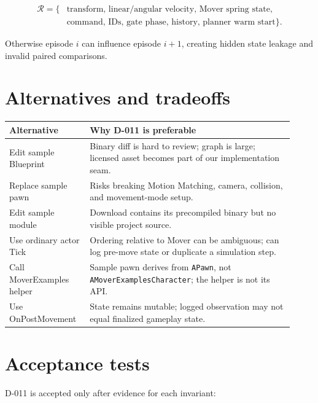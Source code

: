 \documentclass[11pt]{article}
\begin{document}
\begin{align}
  \mathcal{R}=\{&\text{transform, linear/angular velocity, Mover spring state,}\nonumber\\
                 &\text{command, IDs, gate phase, history, planner warm start}\}.
\end{align}

Otherwise episode $i$ can influence episode $i+1$, creating hidden state leakage and invalid paired
comparisons.

\section{Alternatives and tradeoffs}\label{sec:alternatives}

\begin{tabular}{p{0.25\linewidth}p{0.67\linewidth}}
\toprule
Alternative & Why D-011 is preferable \\
\midrule
Edit sample Blueprint & Binary diff is hard to review; graph is large; licensed asset becomes part
of our implementation seam. \\
Replace sample pawn & Risks breaking Motion Matching, camera, collision, and movement-mode setup. \\
Edit sample module & Download contains its precompiled binary but no visible project source. \\
Use ordinary actor Tick & Ordering relative to Mover can be ambiguous; can log pre-move state or
duplicate a simulation step. \\
Call MoverExamples helper & Sample pawn derives from \texttt{APawn}, not
\texttt{AMoverExamplesCharacter}; the helper is not its API. \\
Use OnPostMovement & State remains mutable; logged observation may not equal finalized gameplay
state. \\
\bottomrule
\end{tabular}

\section{Acceptance tests}\label{sec:tests}

D-011 is accepted only after evidence for each invariant:
\end{document}
